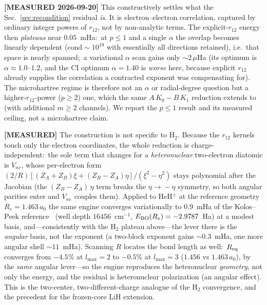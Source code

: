 \documentclass[aps,pra,twocolumn,superscriptaddress,longbibliography]{revtex4-2}
\newcommand{\gvq}[2]{#2}
\begin{document}
\textbf{[MEASURED 2026-09-20]} This constructively settles what the
Sec.~\ref{sec:recondition} residual \emph{is}.  It is
electron--electron correlation, captured by ordinary integer powers of
$r_{12}$, not by non-analytic terms.  The
explicit-$r_{12}$ energy then \emph{plateaus} near $0.05$~mHa:\ at $p\le 1$
and a single $\alpha$ the overlap becomes linearly dependent
($\mathrm{cond}\sim\!10^{19}$ with essentially all directions retained),
i.e.\ that space is nearly spanned;\ a variational $\alpha$ scan gains only
$\sim\!2\,\mu$Ha (its optimum is $\alpha\approx 1.0\text{--}1.2$, and the
CI optimum $\alpha = \gvq{p12_rebased_alpha_opt}{1.40}$ is \emph{worse}
here, because explicit $r_{12}$ already supplies the correlation a
contracted exponent was compensating for).  The microhartree regime is
therefore not an $\alpha$ or radial-degree question but a higher-$r_{12}$-power
($p\ge 2$) one, which the same $A\,K_0 - B\,K_1$ reduction extends to
(with additional $m\ge 2$ channels).  We report the $p\le 1$ result and its
measured ceiling, not a microhartree claim.

\textbf{[MEASURED]} The construction is not specific to H$_2$.  Because the
$r_{12}$ kernels touch only the electron coordinates, the whole reduction is
charge-independent:\ the sole term that changes for a \emph{heteronuclear}
two-electron diatomic is $V_{ne}$, whose per-electron form
$(2/R)[(Z_A+Z_B)\xi + (Z_B-Z_A)\eta]/(\xi^2-\eta^2)$ stays polynomial after the
Jacobian (the $(Z_B-Z_A)\,\eta$ term breaks the $\eta\!\to\!-\eta$ symmetry, so
both angular parities enter and $V_{ne}$ couples them).  Applied to HeH$^+$
at the reference geometry $R_e = 1.463\,a_0$ the same engine converges
variationally to $\gvq{p12_r12_heh_err_mha}{0.9}$~mHa of the Kolos--Peek
reference~\cite{KolosPeek1976} (well depth $16456$~cm$^{-1}$, $E_{\rm BO}(R_e)
= -2.9787$~Ha) at a modest basis, and---consistently with the H$_2$ plateau
above---the lever there is the \emph{angular} basis, not the exponent (a
two-block exponent gains $\sim\!0.3$~mHa, one more angular shell $\sim\!11$~mHa).
Scanning $R$ locates the bond length as well:\ $R_{\rm eq}$ converges from
$-4.5\%$ at $l_{\max}=2$ to $-0.5\%$ at $l_{\max}=3$ ($1.456$ vs $1.463\,a_0$),
by the \emph{same} angular lever---so the engine reproduces the heteronuclear
\emph{geometry}, not only the energy, and the residual is heteronuclear
polarization (an angular effect).  This is the two-center, two-different-charge
analogue of the H$_2$ convergence, and the precedent for the frozen-core LiH
extension.
\end{document}
